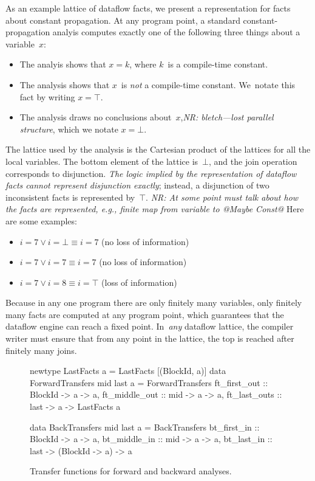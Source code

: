 \documentclass[blockstyle,preprint,nocopyrightspace]{sigplanconf}
\newcommand{\authornote}[1]{{\em #1}}
\newcommand{\norman}[1]{\authornote{NR: #1}}
\let\remark\norman
\newcommand\figlabel[1]{\label{fig:#1}}
\begin{document}
As an example lattice of dataflow facts, 
we present a representation for facts about constant propagation.
At any program point, a standard constant-propagation analyis
computes exactly one of the following three
things about a variable~$x$:
\begin{itemize}
\item
The analyis shows that
$x = k$, where $k$~is a compile-time constant.
\item
The analysis shows that $x$~is \emph{not} a compile-time constant.
We~notate this fact by writing $x = \top$.
\item
The analysis draws no conclusions about~$x$,\remark{bletch---lost
parallel structure}, which we notate $x=\bot$.
\end{itemize}
The lattice  used by the analysis is the Cartesian product of the
lattices for all the local variables.
The bottom element of the lattice is~$\bot$, and
the join operation corresponds to disjunction.
\emph{The logic implied by the
representation of dataflow facts cannot represent disjunction
exactly}; instead, a
disjunction of two inconsistent facts is represented by~$\top$.
\remark{At some point must talk about how the facts are
\emph{represented}, e.g., finite map from variable to @Maybe Const@}
Here are some examples:
\begin{itemize}
\item
$i = 7 \lor i=\bot \equiv i=7$ (no loss of information)
\item
$i = 7 \lor i= 7 \equiv  i=7$ (no loss of information)
\item
$i = 7 \lor i = 8 \equiv i = \top$ (loss of information)
\end{itemize}
Because in any one program there are only finitely many variables,
only finitely many facts are computed at any program point, which
guarantees that the dataflow engine can
reach a fixed point.
In~\emph{any} dataflow lattice, the compiler writer must ensure that 
from any point in the lattice, the top is reached after finitely many joins.


\begin{figure}
\begin{code}
newtype LastFacts a = LastFacts [(BlockId, a)] 
data ForwardTransfers mid last a = ForwardTransfers
 {ft_first_out  :: BlockId -> a -> a,
  ft_middle_out :: mid     -> a -> a,
  ft_last_outs  :: last    -> a -> LastFacts a} 

data BackTransfers mid last a = BackTransfers
 {bt_first_in  :: BlockId -> a              -> a,
  bt_middle_in :: mid     -> a              -> a,
  bt_last_in   :: last    -> (BlockId -> a) -> a} 
\end{code}
\caption{Transfer functions for forward and backward analyses.}
\figlabel{transfers}
%
%
\end{figure}
\end{document}

